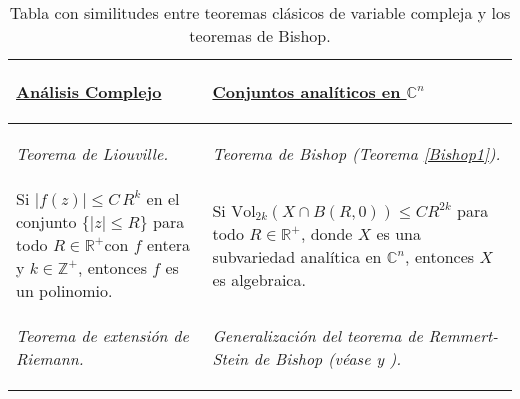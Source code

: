 \documentclass{article}
\newcommand{\zah}{\ensuremath{ \mathbb Z }}
\newcommand{\con}{\ensuremath{\mathbb{C}^n}}
\newcommand{\re}{\ensuremath{\mathbb R }}
\begin{document}
\begin{table}[hpt]
        \caption{Tabla con similitudes entre teoremas cl\'asicos de variable compleja y los teoremas de Bishop.}\label{Tab}
        \centering
        \begin{tabular}{|m{5.5cm}|m{5.5cm}|} \hline
                        \begin{center} \vspace*{0.2cm} 
                                \underline{\textbf{An\'alisis Complejo}} 
                        \end{center} & 
                        \begin{center} \vspace*{0.2cm}
                                \underline{\textbf{Conjuntos anal\'iticos en $\con$}}
                        \end{center} \\
                \hline
                \begin{center} 
                        \textit{Teorema de Liouville.}
                \end{center} & 
                \begin{center}
                        \textit{Teorema de Bishop (Teorema \ref{Bishop1}).}
                \end{center}\\ 
                        \hline Si $\vert f(z)\vert\leq C\,R^k$ en el conjunto $\{\vert z\vert\leq R\}$ 
                        para todo $R\in\re^{+}$con $f$ entera y $k\in\zah^{+}$, entonces 
                        $f$ es un polinomio. 
                        &
                        \vspace{0.1cm}
                        Si $\textrm{Vol}_{2k}(X\cap B(R,0))\leq CR^{2k}$ para todo
                        $R\in\re^{+}$, donde $X$ es una subvariedad anal\'itica en $\con$, entonces $X$ es algebraica.\\ 
                        \hline
                        \vspace{0.1cm}
                        \begin{center} 
                        \textit{Teorema de extensi\'on de Riemann.}
                \end{center} 
                        & 
                \begin{center} 
                        \textit{Generalizaci\'on del teorema de Remmert-Stein de Bishop (v\'ease \cite{R-S} y \cite[p. 34]{Stolzenberg}).}
                \end{center} \\ 

\end{tabular}
\end{table}
\end{document}
